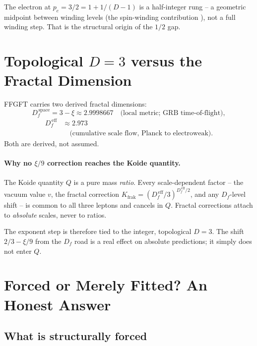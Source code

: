 The electron at \(p_e = 3/2 = 1 + 1/(D-1)\) is a half-integer rung --
a geometric midpoint between winding levels (the spin-winding contribution
\cite{PascherDok051}), not a full winding step. That is the structural origin of the \(1/2\) gap.

\section{Topological \(D=3\) versus the Fractal Dimension}
\label{sec:df}

FFGFT carries two derived fractal dimensions:
\begin{equation}
  D_f^{\,\text{space}} = 3 - \xi \approx 2.9998667
  \quad\text{(local metric; GRB time-of-flight)},
\end{equation}
\begin{align*}
  D_f^{\,\text{eff}} &\approx 2.973\\
  &\quad\text{(cumulative scale flow, Planck to electroweak)}.
\end{align*}
Both are derived, not assumed.

\paragraph{Why no \(\xi/9\) correction reaches the Koide quantity.}
The Koide quantity \(Q\) is a pure mass \emph{ratio}. Every scale-dependent
factor -- the vacuum value \(v\), the fractal correction
\(K_{\text{frak}} = (D_f^{\,\text{eff}}/3)^{D_f^{\,\text{eff}}/2}\),
and any \(D_f\)-level shift -- is common to all three leptons and cancels
in \(Q\). Fractal corrections attach to \emph{absolute} scales, never to
ratios.

The exponent step is therefore tied to the integer, topological \(D=3\).
The shift \(2/3 - \xi/9\) from the \(D_f\) road is a real effect on
absolute predictions; it simply does not enter \(Q\).

\section{Forced or Merely Fitted? An Honest Answer}

\subsection*{What is structurally forced}

